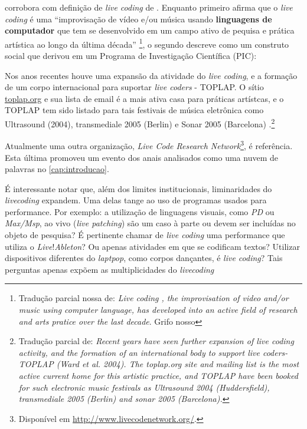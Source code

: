  corrobora com definição de \emph{live coding} de . Enquanto primeiro afirma que o \emph{live coding} é uma  ``improvisação de vídeo e/ou música usando \textbf{linguagens de computador} que tem se desenvolvido em um campo ativo de pequisa e prática artística ao longo da última década'' \footnote{Tradução parcial nossa de: \emph{Live coding , the improvisation of video and/or music using computer language, has developed into an active field of research and arts pratice over the last decade}. Grifo nosso}, o segundo descreve como um construto social que derivou em um Programa de Investigação Científica (PIC):

\begin{citacao} 
Nos anos recentes houve uma expansão da atividade do \emph{live coding}, e a formação de um corpo internacional para suportar \emph{live coders} - TOPLAP. O sítio \url{toplap.org} e sua lista de email é a mais ativa casa para práticas artístcas, e o TOPLAP tem sido listado para tais festivais de música eletrônica como Ultrasound (2004), transmediale 2005 (Berlin) e Sonar 2005 (Barcelona) \cite[p.~3-4]{blackwell_programming_2005}.\footnote{Tradução parcial de: \emph{Recent years have seen further expansion of live coding activity, and the formation of an international body to support live coders- TOPLAP (Ward et al. 2004). The toplap.org site and mailing list is the most active current home for this artistic practice, and TOPLAP have been booked for such electronic music festivals as Ultrasound 2004 (Huddersfield), transmediale 2005 (Berlin) and sonar 2005 (Barcelona).}}
\end{citacao}

Atualmente uma outra organização, \emph{Live Code Research Network}\footnote{Disponível em \url{http://www.livecodenetwork.org/}.}, é referência. Esta última promoveu um evento dos anais analisados como uma nuvem de palavras no \autoref{cap:introducao}. 

É interessante notar que, além dos limites institucionais, liminaridades do \emph{livecoding} expandem. Uma delas tange ao uso de programas usados para performance. Por exemplo: a utilização de linguagens visuais, como \emph{PD} ou \emph{Max/Msp}, ao vivo (\emph{live patching}) são um caso à parte ou devem ser incluídas no objeto de pesquisa? É pertinente chamar de \emph{live coding} uma performance que utiliza o \emph{Live}!\emph{Ableton}? Ou apenas atividades em que se codificam textos? Utilizar dispositivos diferentes do \emph{laptpop}, como corpos dançantes, é \emph{live coding}? Tais perguntas apenas expõem as multiplicidades do \emph{livecoding}

